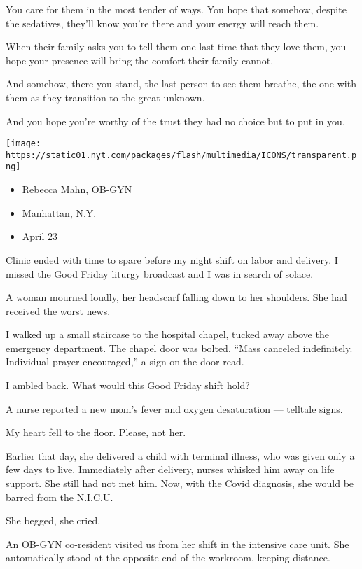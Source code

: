 You care for them in the most tender of ways. You hope that somehow,
despite the sedatives, they'll know you're there and your energy will
reach them.

When their family asks you to tell them one last time that they love
them, you hope your presence will bring the comfort their family cannot.

And somehow, there you stand, the last person to see them breathe, the
one with them as they transition to the great unknown.

And you hope you're worthy of the trust they had no choice but to put in
you.

\texttt{[image: https://static01.nyt.com/packages/flash/multimedia/ICONS/transparent.png]}

\begin{itemize}
\tightlist
\item
  Rebecca Mahn, OB-GYN
\item
  Manhattan, N.Y.
\item
  April 23
\end{itemize}

Clinic ended with time to spare before my night shift on labor and
delivery. I missed the Good Friday liturgy broadcast and I was in search
of solace.

A woman mourned loudly, her headscarf falling down to her shoulders. She
had received the worst news.

I walked up a small staircase to the hospital chapel, tucked away above
the emergency department. The chapel door was bolted. ``Mass canceled
indefinitely. Individual prayer encouraged,'' a sign on the door read.

I ambled back. What would this Good Friday shift hold?

A nurse reported a new mom's fever and oxygen desaturation --- telltale
signs.

My heart fell to the floor. Please, not her.

Earlier that day, she delivered a child with terminal illness, who was
given only a few days to live. Immediately after delivery, nurses
whisked him away on life support. She still had not met him. Now, with
the Covid diagnosis, she would be barred from the N.I.C.U.

She begged, she cried.

An OB-GYN co-resident visited us from her shift in the intensive care
unit. She automatically stood at the opposite end of the workroom,
keeping distance.

